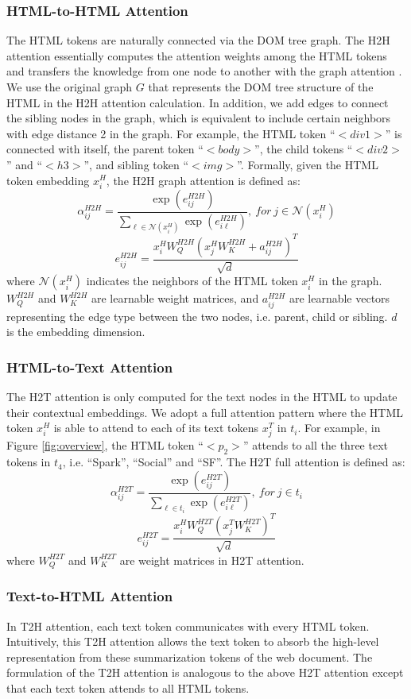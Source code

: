 \documentclass[sigconf]{acmart}
\begin{document}
\subsubsection{HTML-to-HTML Attention}
The HTML tokens are naturally connected via the DOM tree graph. The H2H attention essentially computes the attention weights among the HTML tokens and transfers the knowledge from one node to another with the graph attention \cite{VelickovicCCRLB18}. We use the original graph $G$ that represents the DOM tree structure of the HTML in the H2H attention calculation. In addition, we add edges to connect the sibling nodes in the graph, which is equivalent to include certain neighbors with edge distance 2 in the graph. For example, the HTML token ``$<$$div1$$>$'' is connected with itself, the parent token ``$<$$body$$>$'', the child tokens ``$<$$div2$$>$'' and ``$<$$h3$$>$'', and sibling token ``$<$$img$$>$''. Formally, given the HTML token embedding $x_i^H$, the H2H graph attention is defined as:
\[\alpha^{H2H}_{ij} = \frac{\exp(e^{H2H}_{ij})}{\sum_{\ell\in \mathcal{N}(x_i^H)} \exp(e^{H2H}_{i\ell})}, \ for \ j \in \mathcal{N}(x_i^H)\]
%
\[e^{H2H}_{ij} = \frac{x^H_i W_Q^{H2H} (x^H_j W_K^{H2H} + a_{ij}^{H2H})^T}{\sqrt{d}}\]
\noindent where $\mathcal{N}(x_i^H)$ indicates the neighbors of the HTML token $x_i^H$ in the graph. $W_Q^{H2H}$ and $W_K^{H2H}$ are learnable weight matrices, and $a_{ij}^{H2H}$ are learnable vectors representing the edge type between the two nodes, i.e. parent, child or sibling. $d$ is the embedding dimension.

\subsubsection{HTML-to-Text Attention}
The H2T attention is only computed for the text nodes in the HTML to update their contextual embeddings.
We adopt a full attention pattern where the HTML token $x_i^H$ is able to attend to each of its text tokens $x_j^T$ in $t_i$.
For example, in Figure \ref{fig:overview}, the HTML token ``$<$$p_2$$>$'' attends to all the three text tokens in $t_4$, i.e. ``Spark'', ``Social'' and ``SF''. The H2T full attention is defined as:
\[\alpha^{H2T}_{ij} = \frac{\exp(e^{H2T}_{ij})}{\sum_{\ell\in t_i} \exp(e^{H2T}_{i\ell})}, \ for \ j \in t_i\]
%
\[e^{H2T}_{ij} = \frac{x^H_i W_Q^{H2T} (x^T_j W_K^{H2T})^T}{\sqrt{d}}\]
\noindent where $W_Q^{H2T}$ and $W_K^{H2T}$ are weight matrices in H2T attention.

\subsubsection{Text-to-HTML Attention}
In T2H attention, each text token communicates with every HTML token. Intuitively, this T2H attention allows the text token to absorb the high-level representation from these summarization tokens of the web document. The formulation of the T2H attention is analogous to the above H2T attention except that each text token attends to all HTML tokens.
\end{document}
